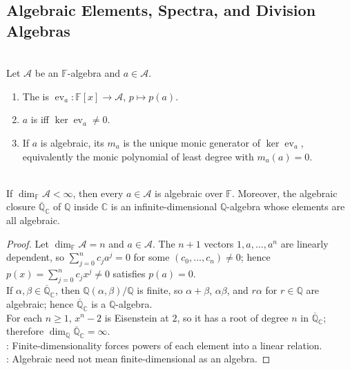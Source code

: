 \subsection{Algebraic Elements, Spectra, and Division Algebras}

\begin{definition} \label{def:algebraic-element-minimal-polynomial-algebra} \\
Let $\mathcal{A}$ be an $\mathbb{F}$-algebra and $a\in\mathcal{A}$.
\begin{enumerate}[label=(\roman*)]
\setlength{\itemsep}{0pt}
\item The  is $\operatorname{ev}_a:\mathbb{F}[x]\to\mathcal{A}$, $p\mapsto p(a)$.
\item $a$ is  iff $\ker\operatorname{ev}_a\neq0$.
\item If $a$ is algebraic, its  $m_a$ is the unique monic generator of $\ker\operatorname{ev}_a$, equivalently the monic polynomial of least degree with $m_a(a)=0$.
\end{enumerate}
\end{definition}

\begin{theorem} \label{thm:finite-dimensional-algebras-algebraic-elements} \\
If $\dim_{\mathbb{F}}\mathcal{A}<\infty$, then every $a\in\mathcal{A}$ is algebraic over $\mathbb{F}$. Moreover, the algebraic closure $\overline{\mathbb{Q}}_{\mathbb{C}}$ of $\mathbb{Q}$ inside $\mathbb{C}$ is an infinite-dimensional $\mathbb{Q}$-algebra whose elements are all algebraic.
\begin{proof}
Let $\dim_{\mathbb{F}}\mathcal{A}=n$ and $a\in\mathcal{A}$. The $n+1$ vectors $1,a,\ldots,a^n$ are linearly dependent, so $\sum_{j=0}^{n}c_ja^j=0$ for some $(c_0,\ldots,c_n)\neq0$; hence $p(x)=\sum_{j=0}^{n}c_jx^j\neq0$ satisfies $p(a)=0$.\\
If $\alpha,\beta\in\overline{\mathbb{Q}}_{\mathbb{C}}$, then $\mathbb{Q}(\alpha,\beta)/\mathbb{Q}$ is finite, so $\alpha+\beta$, $\alpha\beta$, and $r\alpha$ for $r\in\mathbb{Q}$ are algebraic; hence $\overline{\mathbb{Q}}_{\mathbb{C}}$ is a $\mathbb{Q}$-algebra.\\
For each $n\geq1$, $x^n-2$ is Eisenstein at $2$, so it has a root of degree $n$ in $\overline{\mathbb{Q}}_{\mathbb{C}}$; therefore $\dim_{\mathbb{Q}}\overline{\mathbb{Q}}_{\mathbb{C}}=\infty$.\\
: Finite-dimensionality forces powers of each element into a linear relation.\\
: Algebraic need not mean finite-dimensional as an algebra.
\end{proof}
\end{theorem}

